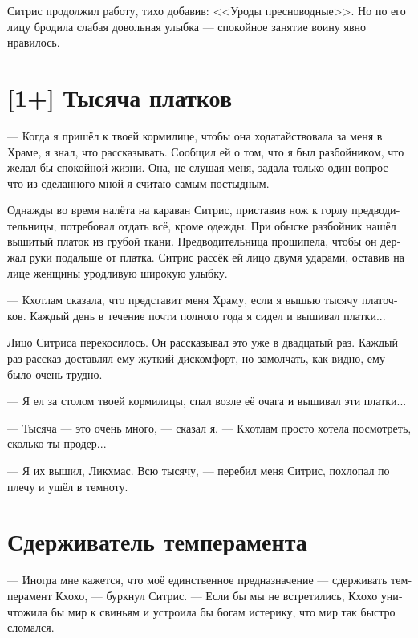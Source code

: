 \documentclass[a4paper,12pt,fleqn]{book}\usepackage{polyglossia}\setdefaultlanguage[babelshorthands=true]{russian}\setotherlanguage{english}\defaultfontfeatures{Ligatures=TeX,Mapping=tex-text}\usepackage{xcolor}\newcommand{\ml}[3]{#2}
\newcommand{\Kchoho}{Kch\`{o}h\^{o}}
\newcommand{\Sitris}{S\~{\i}tr\v{\i}s}
\begin{document}
{Ситрис продолжил работу, тихо добавив: <<Уроды пресноводные>>.
Но по его лицу бродила слабая довольная улыбка --- спокойное занятие воину явно нравилось.

\section{[1+] Тысяча платков}

--- Когда я пришёл к твоей кормилице, чтобы она ходатайствовала за меня в Храме, я знал, что рассказывать.
Сообщил ей о том, что я был разбойником, что желал бы спокойной жизни.
Она, не слушая меня, задала только один вопрос --- что из сделанного мной я считаю самым постыдным.

Однажды во время налёта на караван Ситрис, приставив нож к горлу предводительницы, потребовал отдать всё, кроме одежды.
При обыске разбойник нашёл вышитый платок из грубой ткани.
Предводительница прошипела, чтобы он держал руки подальше от платка.
Ситрис рассёк ей лицо двумя ударами, оставив на лице женщины уродливую широкую улыбку.

--- Кхотлам сказала, что представит меня Храму, если я вышью тысячу платочков.
Каждый день в течение почти полного года я сидел и вышивал платки...

Лицо Ситриса перекосилось.
Он рассказывал это уже в двадцатый раз.
Каждый раз рассказ доставлял ему жуткий дискомфорт, но замолчать, как видно, ему было очень трудно.

--- Я ел за столом твоей кормилицы, спал возле её очага и вышивал эти платки...

--- Тысяча --- это очень много, --- сказал я.
--- Кхотлам просто хотела посмотреть, сколько ты продер...

--- Я их вышил, Ликхмас.
Всю тысячу, --- перебил меня Ситрис, похлопал по плечу и ушёл в темноту.

\section{Сдерживатель темперамента}

\ml{$0$}
{--- Иногда мне кажется, что моё единственное предназначение --- сдерживать темперамент Кхохо, --- буркнул Ситрис.}
{``Sometimes it seems my only destiny is to restrain \Kchoho{}'s temperament,'' \Sitris\ grumbled.}
\ml{$0$}
{--- Если бы мы не встретились, Кхохо уничтожила бы мир к свиньям и устроила бы богам истерику, что мир так быстро сломался.}
{``If we hadn't met, \Kchoho{} would have destroyed the world and made an uproar to gods because it wasn't stable enough.''}

}
\end{document}
